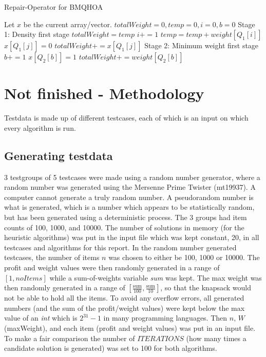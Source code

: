\documentclass[titlepage]{article}
\begin{document}
\begin{breakablealgorithm}
\caption{Repair-Operator for BMQHOA}\label{harmonicRepair}
    \begin{algorithmic}
        \State Let $x$ be the current array/vector.
        \State $totalWeight = 0, temp = 0, i = 0, b = 0$
        \State Stage 1: Density first stage
            \State $totalWeight = temp$
            \State $i += 1$
            \State $temp = temp + weight[Q_{1}[i]]$
        \EndWhile
            \State $x[Q_{1}[j]] = 0$
            \State $totalWeight += x[Q_{1}[j]]$
        \EndFor
        \State Stage 2: Minimum weight first stage
            \State $b += 1$
                    \State $x[Q_{2}[b]] = 1$
                \State $totalWeight += weight[Q_{2}[b]]$
            \EndIf
        \EndWhile
    \end{algorithmic}
\end{breakablealgorithm}

\newpage

\section{Not finished - Methodology}

Testdata is made up of different testcases, each of which is an input on which every algorithm is run.

\subsection{Generating testdata}

3 testgroups of 5 testcases were made using a random number generator, where a random number was generated using the Mersenne Prime Twister (mt19937). A computer cannot generate a truly random number. A pseudorandom number is what is generated, which is a number which appears to be statistically random, but has been generated using a deterministic process. The 3 groups had item counts of 100, 1000, and 10000. The number of solutions in memory (for the heuristic algorithms) was put in the input file which was kept constant, 20, in all testcases and algorithms for this report. In the random number generated testcases, the number of items $n$ was chosen to either be 100, 1000 or 10000. The profit and weight values were then randomly generated in a range of $ [1, noItems] $ while a sum-of-weights variable \emph{sum} was kept. The max weight was then randomly generated in a range of $[\frac{\text{sum}}{100} , \frac{\text{sum}}{10}]$, so that the knapsack would not be able to hold all the items. To avoid any overflow errors, all generated numbers (and the sum of the profit/weight values) were kept below the max value of an \emph{int} which is $2^{31}-1$ in many programming languages.  Then $n$, $W$ (maxWeight), and each item (profit and weight values) was put in an input file. To make a fair comparison the number of $ITERATIONS$ (how many times a candidate solution is generated) was set to 100 for both algorithms. 
\end{document}
